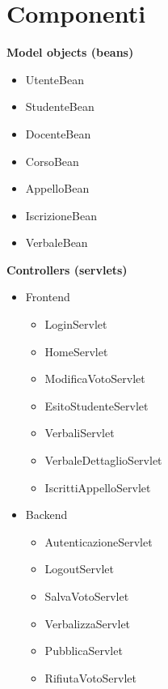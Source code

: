 \documentclass[a4paper,12pt]{scrreprt}
\begin{document}
\section{Componenti}
\noindent
\begin{minipage}[t]{0.48\textwidth}
\textbf{Model objects (beans)}
\begin{itemize}
    \item UtenteBean
    \item StudenteBean
    \item DocenteBean
    \item CorsoBean
    \item AppelloBean
    \item IscrizioneBean
    \item VerbaleBean
\end{itemize}
\textbf{Controllers (servlets)}
\begin{itemize}
    \item Frontend
    \begin{itemize}
        \item LoginServlet
        \item HomeServlet
        \item ModificaVotoServlet
        \item EsitoStudenteServlet
        \item VerbaliServlet
        \item VerbaleDettaglioServlet
        \item IscrittiAppelloServlet
    \end{itemize}
    \item Backend
    \begin{itemize}
        \item AutenticazioneServlet
        \item LogoutServlet
        \item SalvaVotoServlet
        \item VerbalizzaServlet
        \item PubblicaServlet
        \item RifiutaVotoServlet
    \end{itemize}
\end{itemize}

\end{minipage}
\hfill
\end{document}
